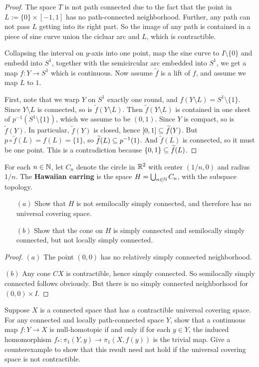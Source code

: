 \begin{proof}
The space $T$ is not path connected due to the fact that the point in $L:=\{0\}\times[-1,1]$ has no path-connected neighborhood. Further, any path can not pass $L$ getting into its right part. So the image of any path is contained in a piece of sine curve union the cicluar arc and $L$, which is contractible.\par
Collapsing the interval on $y$-axis into one point, map the sine curve to $I\setminus\{0\}$ and embedd into $S^1$, together with the semicircular arc embedded into $S^1$, we get a map $f:Y\to S^1$ which is continuous. Now assume $\widetilde{f}$ is a lift of $f$, and assume we map $L$ to $1$.\par 
First, note that we warp $Y$ on $S^1$ exactly one round, and $f(Y\setminus L)=S^1\setminus\{1\}$. Since $Y\setminus L$ is connected, so is $\widetilde{f}(Y\setminus L)$. Then $\widetilde{f}(Y\setminus L)$ is contained in one sheet of $p^{-1}(S^1\setminus\{1\})$, which we assume to be $(0,1)$. Since $Y$ is compact, so is $\widetilde{f}(Y)$. In particular, $\widetilde{f}(Y)$ is closed, hence $[0,1]\subseteq\widetilde{f}(Y)$. But $p\circ \widetilde{f}(L)=f(L)=\{1\}$, so $\widetilde{f}(L)\subseteq p^{-1}(1)$. And $\widetilde{f}(L)$ is connected, so it must be one point. This is a contradiction because $\{0,1\}\subseteq\widetilde{f}(L)$.
\end{proof}
\begin{exercise}
For each $n\in\mathbb{N}$, let $C_n$ denote the circle in $\mathbb{R}^2$ with center $(1/n,0)$ and radius $1/n$. The \textbf{Hawaiian earring} is the space $H=\bigcup_{n\in\mathbb{N}}C_n$, with the subspace topology.
\begin{itemize}
\item[$(a)$]Show that $H$ is not semilocally simply connected, and therefore has no universal covering space.
\item[$(b)$]Show that the cone on $H$ is simply connected and semilocally simply connected, but not locally simply connected.
\end{itemize}
\end{exercise}
\begin{proof}
$(a)$ The point $(0,0)$ has no relatively simply connected neighborhood.\par
$(b)$ Any cone $CX$ is contractible, hence simply connected. So semilocally simply connected follows obviously. But there is no simply connected neighborhood for $(0,0)\times I$.
\end{proof}
\begin{exercise}
Suppose $X$ is a connected space that has a contractible universal covering space. For any connected and locally path-connected space $Y$, show that a continuous map $f:Y\to X$ is null-homotopic if and only if for each $y\in Y$, the induced homomorphism $f_*:\pi_1(Y,y)\to\pi_1(X,f(y))$ is the trivial map.
Give a counterexample to show that this result need not hold if the universal covering space is not contractible.
\end{exercise}
